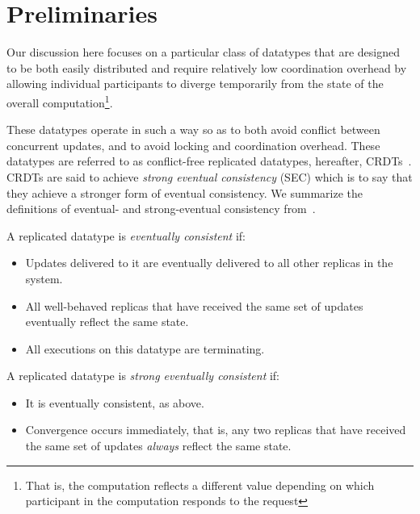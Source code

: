 \section{Preliminaries}

Our discussion here focuses on a particular class of datatypes that are designed
to be both easily distributed and require relatively low coordination overhead
by allowing individual participants to diverge temporarily from the state of the
overall computation\footnote{That is, the computation reflects a different
value depending on which participant in the computation responds to the
request}.

These datatypes operate in such a way so as to both avoid conflict between
concurrent updates, and to avoid locking and coordination overhead. These
datatypes are referred to as conflict-free replicated datatypes, hereafter,
CRDTs~\citep{shapiro11}. CRDTs are said to achieve \textit{strong eventual
consistency} (SEC) which is to say that they achieve a stronger form of eventual
consistency. We summarize the definitions of eventual- and strong-eventual
consistency from~\cite{shapiro11}.

\begin{definition}
  A replicated datatype is \textit{eventually consistent} if:
  \begin{itemize}
    \item Updates delivered to it are eventually delivered to all other replicas
      in the system.
    \item All well-behaved replicas that have received the same set of updates
      eventually reflect the same state.
    \item All executions on this datatype are terminating.
  \end{itemize}
\end{definition}

\begin{definition}
  A replicated datatype is \textit{strong eventually consistent} if:
  \begin{itemize}
    \item It is eventually consistent, as above.
    \item Convergence occurs immediately, that is, any two replicas that have
      received the same set of updates \textit{always} reflect the same state.
  \end{itemize}
\end{definition}


